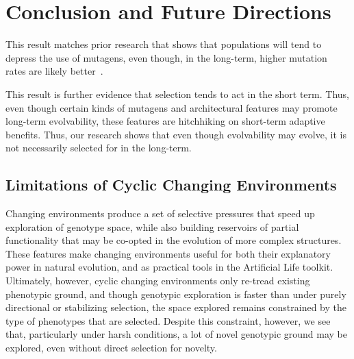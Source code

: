 \documentclass[PhD]{msu-thesis}
\begin{document}







\chapter{Conclusion and Future Directions}
\label{chap:conclusion}

This result matches prior research that shows that populations will tend to depress the use of mutagens, even though, in the long-term, higher mutation rates are likely better~\cite{clune_natural_2008}.  

This result is further evidence that selection tends to act in the short term. Thus, even though certain kinds of mutagens and architectural features may promote long-term evolvability, these features are hitchhiking on short-term adaptive benefits. Thus, our research shows that even though evolvability may evolve, it is not necessarily selected for in the long-term. 

\section{Limitations of Cyclic Changing Environments}
Changing environments produce a set of selective pressures that speed up exploration of genotype space, while also building reservoirs of partial functionality that may be co-opted in the evolution of more complex structures. These features make changing environments useful for both their explanatory power in natural evolution, and as practical tools in the Artificial Life toolkit.
Ultimately, however, cyclic changing environments only re-tread existing phenotypic ground, and though genotypic exploration is faster than under purely directional or stabilizing selection, the space explored remains constrained by the type of phenotypes that are selected. Despite this constraint, however, we see that, particularly under harsh conditions, a lot of novel genotypic ground may be explored, even without direct selection for novelty. 
\end{document}
